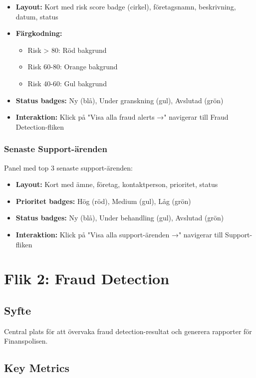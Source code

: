 \documentclass[12pt,a4paper]{article}
\begin{document}
\begin{itemize}
  \item \textbf{Layout:} Kort med risk score badge (cirkel), företagsnamn, beskrivning, datum, status
  \item \textbf{Färgkodning:} 
  \begin{itemize}
    \item Risk > 80: Röd bakgrund
    \item Risk 60-80: Orange bakgrund
    \item Risk 40-60: Gul bakgrund
  \end{itemize}
  \item \textbf{Status badges:} Ny (blå), Under granskning (gul), Avslutad (grön)
  \item \textbf{Interaktion:} Klick på "Visa alla fraud alerts →" navigerar till Fraud Detection-fliken
\end{itemize}

\subsubsection{Senaste Support-ärenden}
Panel med top 3 senaste support-ärenden:

\begin{itemize}
  \item \textbf{Layout:} Kort med ämne, företag, kontaktperson, prioritet, status
  \item \textbf{Prioritet badges:} Hög (röd), Medium (gul), Låg (grön)
  \item \textbf{Status badges:} Ny (blå), Under behandling (gul), Avslutad (grön)
  \item \textbf{Interaktion:} Klick på "Visa alla support-ärenden →" navigerar till Support-fliken
\end{itemize}

\section{Flik 2: Fraud Detection}

\subsection{Syfte}
Central plats för att övervaka fraud detection-resultat och generera rapporter för Finanspolisen.

\subsection{Key Metrics}
\end{document}

